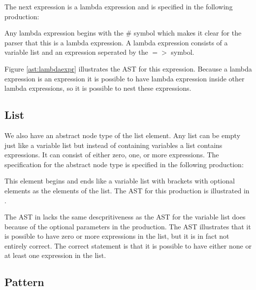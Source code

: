 The next expression is a lambda expression and is specified in the following production:%

\begin{ebnf}%
%
\end{ebnf}%

Any lambda expression begins with the \# symbol which makes it clear for the parser that this is a lambda expression. A lambda expression consists of a variable list and an expression seperated by the $=>$ symbol.%

%

Figure \ref{ast:lambdaexpr} illustrates the AST for this expression. Because a lambda expression is an expression it is possible to have lambda expression inside other lambda expressions, so it is possible to nest these expressions.%

\subsection{List}%

We also have an abstract node type of the list element. Any list can be empty just like a variable list but instead of containing variables a list contains expressions. It can consist of either zero, one, or more expressions. The specification for the abstract node type is specified in the following production:%

\begin{ebnf}%
%
\end{ebnf}%

This element begins and ends like a variable list with brackets with optional elements as the elements of the list. The AST for this production is illustrated in .%

%

The AST in  lacks the same descpritiveness as the AST for the variable list does because of the optional parameters in the production. The AST illustrates that it is possible to have zero or more expressions in the list, but it is in fact not entirely correct. The correct statement is that it is possible to have either none or at least one expression in the list.%

\subsection{Pattern}%

